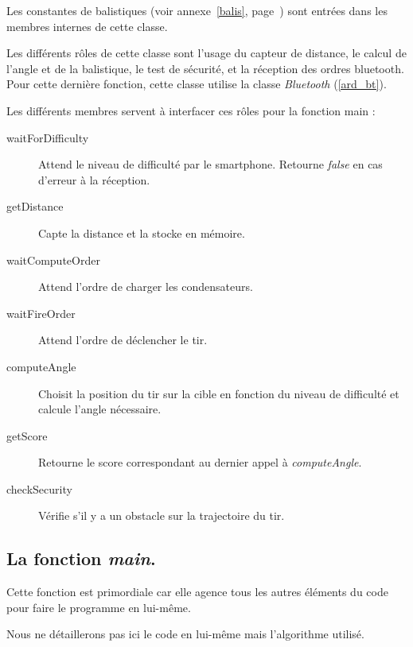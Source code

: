 Les constantes de balistiques (voir annexe~\ref{balis}, page~\pageref{balis}) sont entrées dans les membres internes de cette classe.

Les différents rôles de cette classe sont l'usage du capteur de distance, le calcul de l'angle et de la balistique, le test de sécurité, et la réception des ordres bluetooth. Pour cette dernière fonction, cette classe utilise la classe \emph{Bluetooth} (\ref{ard_bt}).

Les différents membres servent à interfacer ces rôles pour la fonction main : \begin{description}
	\item[waitForDifficulty] Attend le niveau de difficulté par le smartphone. Retourne \emph{false} en cas d'erreur à la réception.
	\item[getDistance] Capte la distance et la stocke en mémoire.
	\item[waitComputeOrder] Attend l'ordre de charger les condensateurs.
	\item[waitFireOrder] Attend l'ordre de déclencher le tir.
	\item[computeAngle] Choisit la position du tir sur la cible en fonction du niveau de difficulté et calcule l'angle nécessaire.
	\item[getScore] Retourne le score correspondant au dernier appel à \emph{computeAngle}.
	\item[checkSecurity] Vérifie s'il y a un obstacle sur la trajectoire du tir.
\end{description}

\subsection{La fonction \emph{main}.} \label{ard_main}
Cette fonction est primordiale car elle agence tous les autres éléments du code pour faire le programme en lui-même.

Nous ne détaillerons pas ici le code en lui-même mais l'algorithme utilisé.

